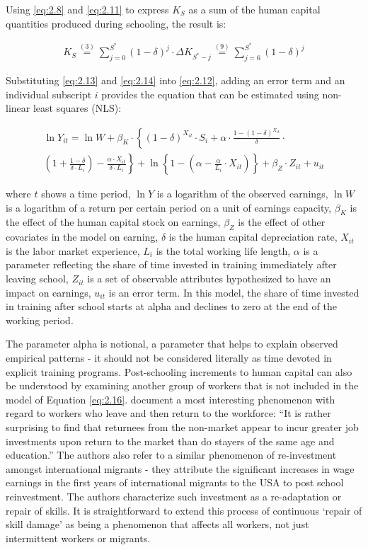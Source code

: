 \documentclass[alpha-refs]{wiley-article-02b}
\begin{document}
Using \ref{eq:2.8} and \ref{eq:2.11} to express $K_{S}$ as a sum of the human capital quantities produced during schooling, the result is:

\begin{align*}\label{eq:2.15} 
K_{S} \stackrel{(3)}{=} \sum_{j=0}^{S^{*}}(1-\delta)^{j} \cdot \Delta K_{S^{*}-j} \stackrel{(9)}{=} \sum_{j=6}^{S^{*}}(1-\delta)^{j}
\end{align*}

Substituting \ref{eq:2.13} and \ref{eq:2.14} into \ref{eq:2.12}, adding an error term and an individual subscript $i$  provides the equation that can be estimated using non-linear least squares (NLS):

\begin{multline}\label{eq:2.16} 
\ln Y_{i t}= \ln W+\beta_{K} \cdot\left\{(1-\delta)^{X_{i t}} \cdot S_{i}+\alpha \cdot \frac{1-(1-\delta)^{X_{i t}}}{\delta}\right.\cdot\\
\left.\left(1+\frac{1-\delta}{\delta \cdot L_{i}}\right)-\frac{\alpha \cdot X_{i t}}{\delta \cdot L_{i}}\right\}+\ln \left\{1-\left(\alpha-\frac{\alpha}{L_{i}} \cdot X_{i t}\right)\right\}+\beta_{Z} \cdot Z_{i t}+u_{i t}
\end{multline}

\noindent
where $t$ shows a time period, $\ln Y$ is a logarithm of the observed 
earnings, $\ln W$ is a logarithm of a return per certain period on a unit 
of earnings capacity, $\beta_{K}$ is the effect of the human capital stock 
on earnings, $\beta_{Z}$ is the effect of other covariates in the model on 
earning, $\delta$ is the human capital depreciation rate, $X_{i t}$ is the 
labor market experience, $L_{i}$ is the total working life length, $\alpha$ 
is a parameter reflecting the share of time invested in training 
immediately after leaving school, $Z_{i t}$ is a set of observable 
attributes hypothesized to have an impact on earnings, $u_{i t}$ is an 
error term. In this model, the share of time invested in training after 
school starts at alpha and declines to zero at the end of the working 
period. 

The parameter alpha is notional, a parameter that helps to explain 
observed empirical patterns - it should not be considered literally as time 
devoted in explicit training programs. Post-schooling increments to human 
capital can also be understood by examining another group of workers that 
is not included in the model of Equation \ref{eq:2.16}.  \cite{Mincer_1982} 
document a most interesting phenomenon with regard to workers who leave and 
then return to the workforce: ``It is rather surprising to find that 
returnees from the non-market appear to incur greater job investments upon 
return to the market than do stayers of the same age and education.'' The 
authors also refer to a similar phenomenon of re-investment amongst 
international migrants - they attribute the significant increases in wage 
earnings in the first years of international migrants to the USA to post 
school reinvestment. The authors characterize such investment as a 
re-adaptation or repair of skills. It is straightforward to extend this 
process of continuous `repair of skill damage' as being a phenomenon that 
affects all workers, not just intermittent workers or migrants. 
\end{document}
